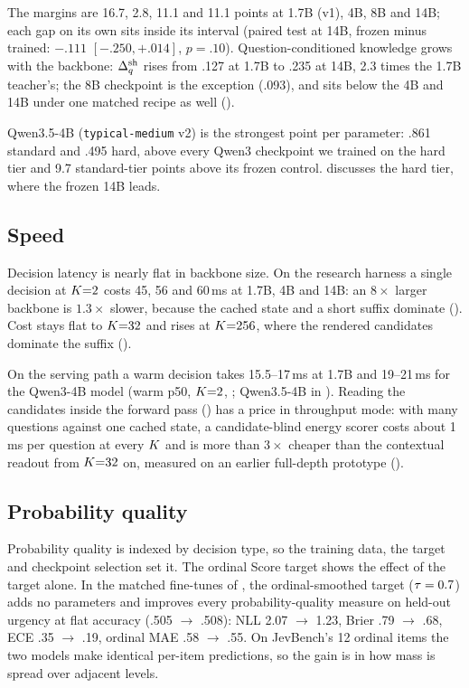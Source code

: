 The margins are 16.7, 2.8, 11.1 and 11.1 points at 1.7B (v1), 4B, 8B and 14B; each gap on its own sits
inside its interval (paired test at 14B, frozen minus trained: $-.111$ $[-.250, +.014]$, $p = .10$).
Question-conditioned
knowledge grows with the backbone: $\Delta_q^{\mathrm{sh}}$ rises from .127 at 1.7B to .235 at 14B, 2.3 times the 1.7B
teacher's; the 8B checkpoint is the exception (.093), and sits below the 4B and 14B under one matched
recipe as well ().

Qwen3.5-4B (\texttt{typical-medium} v2) is the strongest point per parameter: .861 standard and .495
hard, above every Qwen3 checkpoint we trained on the hard tier and 9.7 standard-tier points above its
frozen control.  discusses the hard tier, where the frozen 14B leads.

\subsection{Speed}
\label{sec:results:cost}

Decision latency is nearly flat in backbone size. On the research harness a single decision at
$K{=}2$ costs 45, 56 and 60\,ms at 1.7B, 4B and 14B: an $8\times$ larger backbone is
$1.3\times$ slower, because the cached state and a short suffix dominate ().
Cost stays flat to $K{=}32$ and rises at $K{=}256$, where the rendered candidates
dominate the suffix ().

On the serving path a warm decision takes 15.5--17\,ms at 1.7B and 19--21\,ms for the Qwen3-4B model
(warm p50, $K{=}2$, ; Qwen3.5-4B in ). Reading the candidates inside the forward pass
() has a price in throughput mode: with many questions against one cached
state, a candidate-blind energy scorer costs about 1\,ms per question at every $K$ and is
more than $3\times$ cheaper than the contextual readout from $K{=}32$ on, measured on an earlier
full-depth prototype ().

\subsection{Probability quality}
\label{sec:results:calibration}

Probability quality is indexed by decision type, so the training data, the target and checkpoint
selection set it. The ordinal Score target shows the effect of the target alone. In the matched
fine-tunes of , the ordinal-smoothed target ($\tau = 0.7$) adds no parameters
and improves every probability-quality measure on held-out urgency at flat accuracy (.505 $\to$ .508):
NLL 2.07 $\to$ 1.23, Brier .79 $\to$ .68, ECE .35 $\to$ .19, ordinal MAE .58 $\to$ .55. On JevBench's 12
ordinal items the two models make identical per-item predictions, so the gain is in how mass is spread
over adjacent levels.

